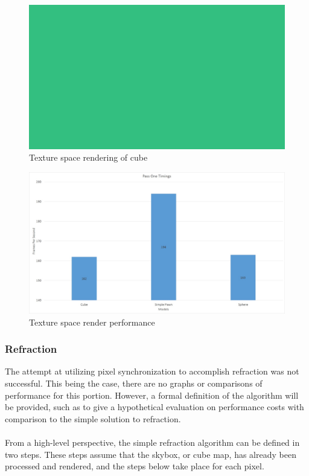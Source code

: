 \documentclass[a4paper, 12pt]{article}
\begin{document}
\begin{figure}[!htb]
	\centering
	\includegraphics[width=1.0\textwidth]{cubeTSpace.jpg}
	\caption{Texture space rendering of cube}
	\label{pic:cubeTSpace}
\end{figure}

\begin{figure}[!htb]
	\centering
	\includegraphics[width=1.0\textwidth]{Pass1Graph.jpg}
	\caption{Texture space render performance}
	\label{pic:Pass1Graph}
\end{figure}

\subsubsection{Refraction}

The attempt at utilizing pixel synchronization to accomplish refraction was
not successful. This being the case, there are no graphs or comparisons of
performance for this portion. However, a formal definition of the algorithm
will be provided, such as to give a hypothetical evaluation on performance
costs with comparison to the simple solution to refraction. \\ \\ From a
high-level perspective, the simple refraction algorithm can be defined in two
steps. These steps assume that the skybox, or cube map, has already been
processed and rendered, and the steps below take place for each pixel.
\end{document}
